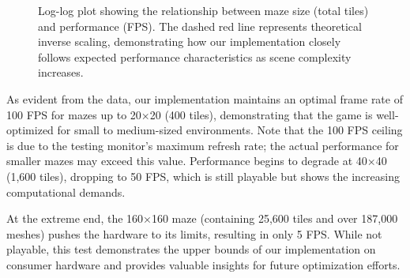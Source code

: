 \documentclass{article}
\begin{document}
\begin{figure}[H]
    \centering
    \caption{Log-log plot showing the relationship between maze size (total tiles) and performance (FPS). The dashed red line represents theoretical inverse scaling, demonstrating how our implementation closely follows expected performance characteristics as scene complexity increases.}
    \label{fig:performance-scaling}
\end{figure}

As evident from the data, our implementation maintains an optimal frame rate of 100 FPS for mazes up to 20×20 (400 tiles), demonstrating that the game is well-optimized for small to medium-sized environments. Note that the 100 FPS ceiling is due to the testing monitor's maximum refresh rate; the actual performance for smaller mazes may exceed this value. Performance begins to degrade at 40×40 (1,600 tiles), dropping to 50 FPS, which is still playable but shows the increasing computational demands.

At the extreme end, the 160×160 maze (containing 25,600 tiles and over 187,000 meshes) pushes the hardware to its limits, resulting in only 5 FPS. While not playable, this test demonstrates the upper bounds of our implementation on consumer hardware and provides valuable insights for future optimization efforts.
\end{document}
